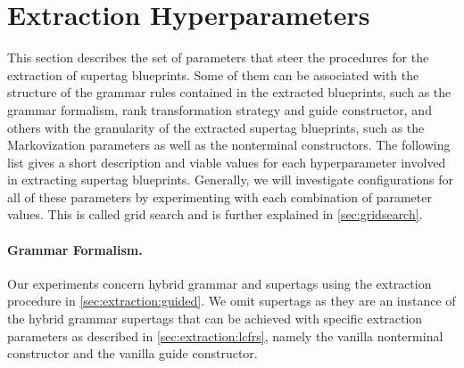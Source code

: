 \documentclass[../../document.tex]{subfiles}
\begin{document}
    \section{Extraction Hyperparameters}\label{sec:hyperparameters}
    This section describes the set of parameters that steer the procedures for the extraction of supertag blueprints.
    Some of them can be associated with the structure of the grammar rules contained in the extracted blueprints, such as the grammar formalism, rank transformation strategy and guide constructor, and others with the granularity of the extracted supertag blueprints, such as the Markovization parameters as well as the nonterminal constructors.
    The following list gives a short description and viable values for each hyperparameter involved in extracting supertag blueprints.
    Generally, we will investigate configurations for all of these parameters by experimenting with each combination of parameter values.
    This is called grid search and is further explained in \cref{sec:gridsearch}.

    \paragraph*{Grammar Formalism.}
    Our experiments concern hybrid grammar and  supertags using the extraction procedure in \cref{sec:extraction:guided}.
    We omit  supertags as they are an instance of the hybrid grammar supertags that can be achieved with specific extraction parameters as described in \cref{sec:extraction:lcfrs}, namely the vanilla nonterminal constructor and the vanilla guide constructor.
\end{document}
